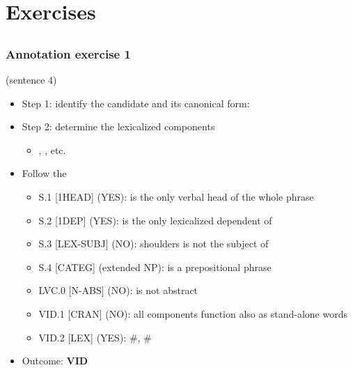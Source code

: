 \documentclass[xcolor=dvipsnames]{beamer}
\begin{document}
\section{Exercises} 
\subsection{}


\begin{frame} 
\frametitle{Annotation exercise 1 \href{https://mwe.phil.hhu.de/}{\beamergotobutton{[FLAT]}}\href{http://parsemefr.lif.univ-mrs.fr/parseme-st-guidelines/1.3}{\beamergotobutton{[guidelines]}}}


 (sentence 4)
\pause
\begin{scriptsize}
\begin{block}{}
\begin{itemize}
\item Step 1: identify the candidate and its canonical form: 
\item Step 2: determine the lexicalized components
   \begin{itemize}
   \item {}, , etc.
   \end{itemize}
\item Follow the \href{http://parsemefr.lif.univ-mrs.fr/parseme-st-guidelines/1.3/?page=040\_Annotation\_process\_-\_decision\_tree}{}
   \begin{itemize}
   \item S.1 [1HEAD] (YES):  is the only verbal head of the whole phrase
   \item S.2 [1DEP] (YES):  is the only lexicalized dependent of 
   \item S.3 [LEX-SUBJ] (NO):  shoulders is not the subject of 
   \item S.4 [CATEG] (extended NP):  is a prepositional phrase
   \item LVC.0 [N-ABS] (NO):  is not abstract
   \item VID.1 [CRAN] (NO): all components function also as stand-alone words
   \item VID.2 [LEX] (YES): \#, \#
   \end{itemize}
\item Outcome: \textbf{VID}
\end{itemize}
\end{block}

\end{scriptsize}

\end{frame}
\end{document}
